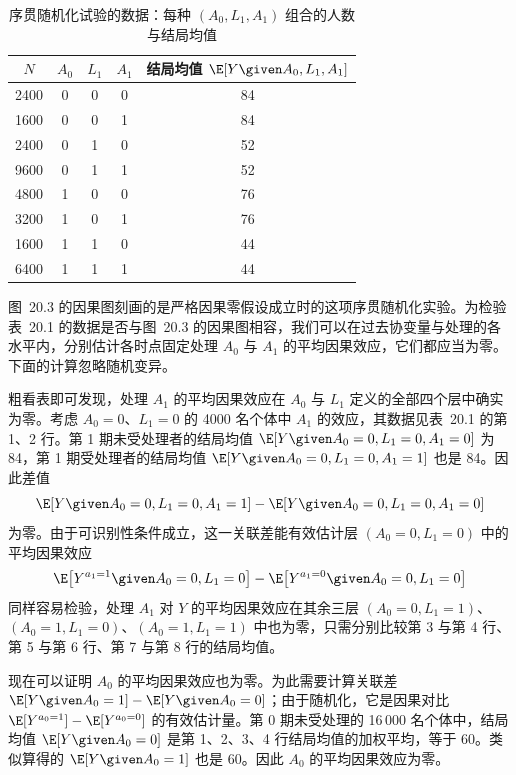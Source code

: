 \begin{table}[htbp]
\centering
\caption{序贯随机化试验的数据：每种 $(A_0,L_1,A_1)$ 组合的人数与结局均值}
\label{tab:20.1}
\small
\begin{tabular}{ccccc}
\toprule
$N$ & $A_0$ & $L_1$ & $A_1$ & 结局均值 $\E[Y\given A_0,L_1,A_1]$ \\
\midrule
2400 & 0 & 0 & 0 & 84 \\
1600 & 0 & 0 & 1 & 84 \\
2400 & 0 & 1 & 0 & 52 \\
9600 & 0 & 1 & 1 & 52 \\
4800 & 1 & 0 & 0 & 76 \\
3200 & 1 & 0 & 1 & 76 \\
1600 & 1 & 1 & 0 & 44 \\
6400 & 1 & 1 & 1 & 44 \\
\bottomrule
\end{tabular}
\end{table}

图~20.3 的因果图刻画的是严格因果零假设成立时的这项序贯随机化实验。为检验表~20.1 的数据是否与图~20.3 的因果图相容，我们可以在过去协变量与处理的各水平内，分别估计各时点固定处理 $A_0$ 与 $A_1$ 的平均因果效应，它们都应当为零。下面的计算忽略随机变异。

粗看表即可发现，处理 $A_1$ 的平均因果效应在 $A_0$ 与 $L_1$ 定义的全部四个层中确实为零。考虑 $A_0=0$、$L_1=0$ 的 4000 名个体中 $A_1$ 的效应，其数据见表~20.1 的第 1、2 行。第 1 期未受处理者的结局均值 $\E[Y\given A_0=0,L_1=0,A_1=0]$ 为 84，第 1 期受处理者的结局均值 $\E[Y\given A_0=0,L_1=0,A_1=1]$ 也是 84。因此差值
\[
\E[Y\given A_0=0,L_1=0,A_1=1]-\E[Y\given A_0=0,L_1=0,A_1=0]
\]
为零。由于可识别性条件成立，这一关联差能有效估计层 $(A_0=0,L_1=0)$ 中的平均因果效应
\[
\E\bigl[Y^{a_1=1}\given A_0=0,L_1=0\bigr]-\E\bigl[Y^{a_1=0}\given A_0=0,L_1=0\bigr]
\]
同样容易检验，处理 $A_1$ 对 $Y$ 的平均因果效应在其余三层 $(A_0=0,L_1=1)$、$(A_0=1,L_1=0)$、$(A_0=1,L_1=1)$ 中也为零，只需分别比较第 3 与第 4 行、第 5 与第 6 行、第 7 与第 8 行的结局均值。

现在可以证明 $A_0$ 的平均因果效应也为零。为此需要计算关联差 $\E[Y\given A_0=1]-\E[Y\given A_0=0]$；由于随机化，它是因果对比 $\E[Y^{a_0=1}]-\E[Y^{a_0=0}]$ 的有效估计量。第 0 期未受处理的 16\,000 名个体中，结局均值 $\E[Y\given A_0=0]$ 是第 1、2、3、4 行结局均值的加权平均，等于 60。类似算得的 $\E[Y\given A_0=1]$ 也是 60。因此 $A_0$ 的平均因果效应为零。

